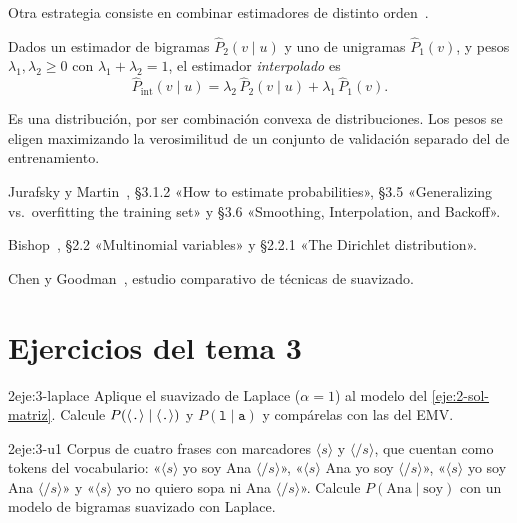 Otra estrategia consiste en combinar estimadores de distinto orden~\cite[§3.6.3]{jm3}.

\begin{definicion}
Dados un estimador de bigramas $\widehat{P}_2(v\mid u)$ y uno de unigramas $\widehat{P}_1(v)$, y pesos $\lambda_1,\lambda_2\ge 0$ con $\lambda_1+\lambda_2=1$, el estimador \emph{interpolado} es
\[
\widehat{P}_{\mathrm{int}}(v\mid u)=\lambda_2\,\widehat{P}_2(v\mid u)+\lambda_1\,\widehat{P}_1(v).
\]
\end{definicion}

Es una distribución, por ser combinación convexa de distribuciones. Los pesos se eligen maximizando la verosimilitud de un conjunto de validación separado del de entrenamiento.

\begin{lecturas}
\item Jurafsky y Martin~\cite{jm3}, §3.1.2 «How to estimate probabilities», §3.5 «Generalizing vs.\ overfitting the training set» y §3.6 «Smoothing, Interpolation, and Backoff».
\item Bishop~\cite{bishop}, §2.2 «Multinomial variables» y §2.2.1 «The Dirichlet distribution».
\item Chen y Goodman~\cite{chen-goodman}, estudio comparativo de técnicas de suavizado.
\end{lecturas}

\section*{Ejercicios del tema 3}

\begin{ejercicio}{2}{eje:3-laplace}
Aplique el suavizado de Laplace ($\alpha=1$) al modelo del \cref{eje:2-sol-matriz}. Calcule $P(\langle\texttt{.}\rangle\mid\langle\texttt{.}\rangle)$ y $P(\texttt{l}\mid\texttt{a})$ y compárelas con las del EMV.
\end{ejercicio}

\begin{ejercicio}{2}{eje:3-u1}
Corpus de cuatro frases con marcadores $\langle s\rangle$ y $\langle/s\rangle$, que cuentan como tokens del vocabulario: «$\langle s\rangle$ yo soy Ana $\langle/s\rangle$», «$\langle s\rangle$ Ana yo soy $\langle/s\rangle$», «$\langle s\rangle$ yo soy Ana $\langle/s\rangle$» y «$\langle s\rangle$ yo no quiero sopa ni Ana $\langle/s\rangle$». Calcule $P(\text{Ana}\mid\text{soy})$ con un modelo de bigramas suavizado con Laplace.
\end{ejercicio}

